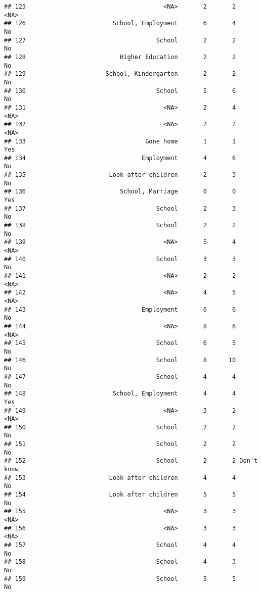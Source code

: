 \documentclass[
]{article}
\begin{document}
\begin{verbatim}
## 125                                      <NA>       2       2       <NA>
## 126                        School, Employment       6       4         No
## 127                                    School       2       2         No
## 128                          Higher Education       2       2         No
## 129                      School, Kindergarten       2       2         No
## 130                                    School       5       6         No
## 131                                      <NA>       2       4       <NA>
## 132                                      <NA>       2       2       <NA>
## 133                                 Gone home       1       1        Yes
## 134                                Employment       4       6         No
## 135                       Look after children       2       3         No
## 136                          School, Marriage       0       0        Yes
## 137                                    School       2       3         No
## 138                                    School       2       2         No
## 139                                      <NA>       5       4       <NA>
## 140                                    School       3       3         No
## 141                                      <NA>       2       2       <NA>
## 142                                      <NA>       4       5       <NA>
## 143                                Employment       6       6         No
## 144                                      <NA>       8       6       <NA>
## 145                                    School       6       5         No
## 146                                    School       8      10         No
## 147                                    School       4       4         No
## 148                        School, Employment       4       4        Yes
## 149                                      <NA>       3       2       <NA>
## 150                                    School       2       2         No
## 151                                    School       2       2         No
## 152                                    School       2       2 Don't know
## 153                       Look after children       4       4         No
## 154                       Look after children       5       5         No
## 155                                      <NA>       3       3       <NA>
## 156                                      <NA>       3       3       <NA>
## 157                                    School       4       4         No
## 158                                    School       4       3         No
## 159                                    School       5       5         No

\end{verbatim}
\end{document}
